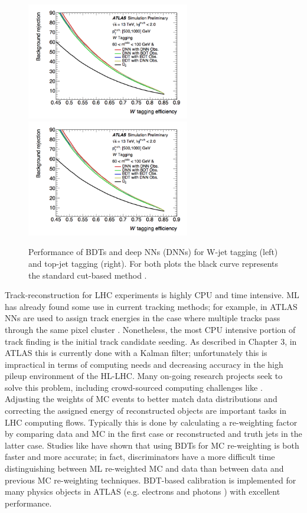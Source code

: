 \begin{figure}[htb!]
        \includegraphics[width=2.8in]{figures/chapter4/w_top_bdt_weff.png}
        \includegraphics[width=2.8in]{figures/chapter4/w_top_bdt_weff.png}
    \caption{Performance of BDTs and deep NNs (DNNs) for W-jet tagging (left) and top-jet tagging (right). For both plots the black curve represents the standard cut-based method \cite{w_top_bdt_paper}.}
    \label{fig:wtop_bdt_plots}
\end{figure}

Track-reconstruction for LHC experiments is highly CPU and time intensive. ML has already found some use in current tracking methods; for example, in ATLAS NNs are used to assign track energies in the case where multiple tracks pass through the same pixel cluster \cite{track_nn}. Nonetheless, the most CPU intensive portion of track finding is the initial track candidate seeding. As described in Chapter 3, in ATLAS this is currently done with a Kalman filter; unfortunately this is impractical in terms of computing needs and decreasing accuracy in the high pileup environment of the HL-LHC. Many on-going research projects seek to solve this problem, including crowd-sourced computing challenges like \cite{track_kaggle}.\\

Adjusting the weights of MC events to better match data distributions and correcting the assigned energy of reconstructed objects are important tasks in LHC computing flows. Typically this is done by calculating a re-weighting factor by comparing data and MC in the first case or reconstructed and truth jets in the latter case. Studies like \cite{bdt_reweight} have shown that using BDTs for MC re-weighting is both faster and more accurate; in fact, discriminators have a more difficult time distinguishing between ML re-weighted MC and data than between data and previous MC re-weighting techniques. BDT-based calibration is implemented for many physics objects in ATLAS (e.g. electrons and photons \cite{bdt_calibration}) with excellent performance.

